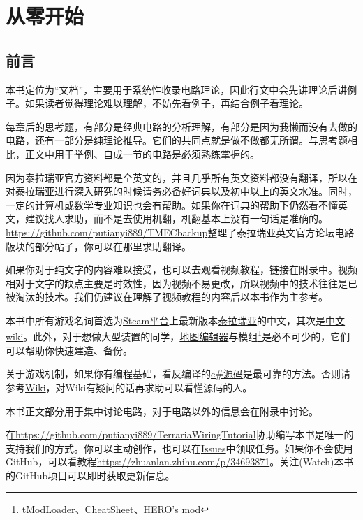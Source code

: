 \chapter{从零开始}

\section{前言}\label{sec1:1}

本书定位为“文档”，主要用于系统性收录电路理论，因此行文中会先讲理论后讲例子。如果读者觉得理论难以理解，不妨先看例子，再结合例子看理论。

每章后的思考题，有部分是经典电路的分析理解，有部分是因为我懒而没有去做的电路，还有一部分是纯理论推导。它们的共同点就是做不做都无所谓。与思考题相比，正文中用于举例、自成一节的电路是必须熟练掌握的。

因为泰拉瑞亚官方资料都是全英文的，并且几乎所有英文资料都没有翻译，所以在对泰拉瑞亚进行深入研究的时候请务必备好词典以及初中以上的英文水准。同时，一定的计算机或数学专业知识也会有帮助。如果你在词典的帮助下仍然看不懂英文，建议找人求助，而不是去使用机翻，机翻基本上没有一句话是准确的。\url{https://github.com/putianyi889/TMECbackup}整理了泰拉瑞亚英文官方论坛电路版块的部分帖子，你可以在那里求助翻译。

如果你对于纯文字的内容难以接受，也可以去观看视频教程，链接在附录中。视频相对于文字的缺点主要是时效性，因为视频不易更改，所以视频中的技术往往是已被淘汰的技术。我们仍建议在理解了视频教程的内容后以本书作为主参考。

本书中所有游戏名词首选为\href{https://store.steampowered.com/}{Steam平台}上最新版本\href{https://store.steampowered.com/app/105600/Terraria/}{泰拉瑞亚}的中文，其次是\href{https://terraria-zh.gamepedia.com/index.php?title=Terraria_Wiki&variant=zh}{中文wiki}。此外，对于想做大型装置的同学，\hyperref[app3]{地图编辑器}与模组\footnote{\hyperref[app4]{tModLoader}、\hyperref[app5]{CheatSheet}、\hyperref[app6]{HERO's mod}}是必不可少的，它们可以帮助你快速建造、备份。

关于游戏机制，如果你有编程基础，看反编译的\hyperref[app8]{c\#源码}是最可靠的方法。否则请参考\hyperref[app2]{Wiki}，对Wiki有疑问的话再求助可以看懂源码的人。

本书正文部分用于集中讨论电路，对于电路以外的信息会在附录中讨论。

在\url{https://github.com/putianyi889/TerrariaWiringTutorial}协助编写本书是唯一的支持我们的方式。你可以主动创作，也可以在\href{https://github.com/putianyi889/TerrariaWiringTutorial/issues}{Issues}中领取任务。如果你不会使用GitHub，可以看教程\url{https://zhuanlan.zhihu.com/p/34693871}。关注(Watch)本书的GitHub项目可以即时获取更新信息。

